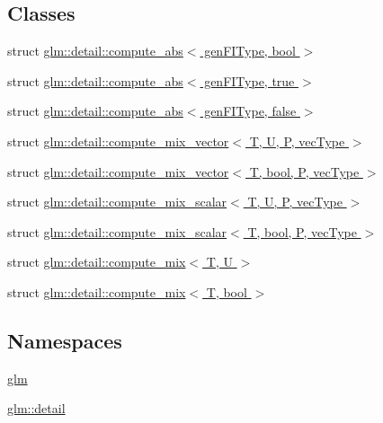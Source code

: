 \subsection*{Classes}
\begin{DoxyCompactItemize}
\item 
struct \hyperlink{structglm_1_1detail_1_1compute__abs}{glm\+::detail\+::compute\+\_\+abs$<$ gen\+F\+I\+Type, bool $>$}
\item 
struct \hyperlink{structglm_1_1detail_1_1compute__abs_3_01gen_f_i_type_00_01true_01_4}{glm\+::detail\+::compute\+\_\+abs$<$ gen\+F\+I\+Type, true $>$}
\item 
struct \hyperlink{structglm_1_1detail_1_1compute__abs_3_01gen_f_i_type_00_01false_01_4}{glm\+::detail\+::compute\+\_\+abs$<$ gen\+F\+I\+Type, false $>$}
\item 
struct \hyperlink{structglm_1_1detail_1_1compute__mix__vector}{glm\+::detail\+::compute\+\_\+mix\+\_\+vector$<$ T, U, P, vec\+Type $>$}
\item 
struct \hyperlink{structglm_1_1detail_1_1compute__mix__vector_3_01_t_00_01bool_00_01_p_00_01vec_type_01_4}{glm\+::detail\+::compute\+\_\+mix\+\_\+vector$<$ T, bool, P, vec\+Type $>$}
\item 
struct \hyperlink{structglm_1_1detail_1_1compute__mix__scalar}{glm\+::detail\+::compute\+\_\+mix\+\_\+scalar$<$ T, U, P, vec\+Type $>$}
\item 
struct \hyperlink{structglm_1_1detail_1_1compute__mix__scalar_3_01_t_00_01bool_00_01_p_00_01vec_type_01_4}{glm\+::detail\+::compute\+\_\+mix\+\_\+scalar$<$ T, bool, P, vec\+Type $>$}
\item 
struct \hyperlink{structglm_1_1detail_1_1compute__mix}{glm\+::detail\+::compute\+\_\+mix$<$ T, U $>$}
\item 
struct \hyperlink{structglm_1_1detail_1_1compute__mix_3_01_t_00_01bool_01_4}{glm\+::detail\+::compute\+\_\+mix$<$ T, bool $>$}
\end{DoxyCompactItemize}
\subsection*{Namespaces}
\begin{DoxyCompactItemize}
\item 
 \hyperlink{namespaceglm}{glm}
\item 
 \hyperlink{namespaceglm_1_1detail}{glm\+::detail}
\end{DoxyCompactItemize}
